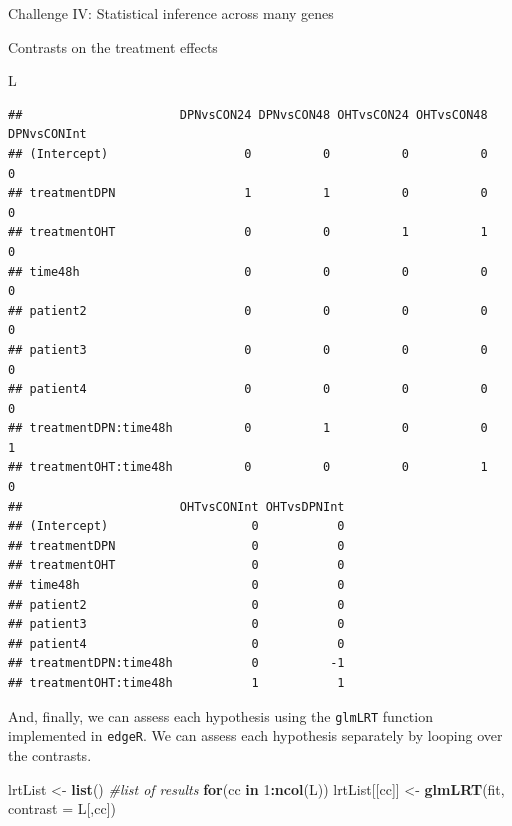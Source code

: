 \documentclass[ignorenonframetext,]{beamer}
\newenvironment{Shaded}{\begin{snugshade}}{\end{snugshade}}
\newcommand{\CommentTok}[1]{\textcolor[rgb]{0.56,0.35,0.01}{\textit{#1}}}
\newcommand{\ControlFlowTok}[1]{\textcolor[rgb]{0.13,0.29,0.53}{\textbf{#1}}}
\newcommand{\DataTypeTok}[1]{\textcolor[rgb]{0.13,0.29,0.53}{#1}}
\newcommand{\DecValTok}[1]{\textcolor[rgb]{0.00,0.00,0.81}{#1}}
\newcommand{\KeywordTok}[1]{\textcolor[rgb]{0.13,0.29,0.53}{\textbf{#1}}}
\newcommand{\NormalTok}[1]{#1}
\newcommand{\OperatorTok}[1]{\textcolor[rgb]{0.81,0.36,0.00}{\textbf{#1}}}
\newcommand{\StringTok}[1]{\textcolor[rgb]{0.31,0.60,0.02}{#1}}
\begin{document}
\begin{frame}[fragile]{Challenge IV: Statistical inference across many
genes}
\begin{block}{Contrasts on the treatment effects}
\begin{Shaded}
\begin{Highlighting}[]
\NormalTok{L}
\end{Highlighting}
\end{Shaded}

\begin{verbatim}
##                      DPNvsCON24 DPNvsCON48 OHTvsCON24 OHTvsCON48 DPNvsCONInt
## (Intercept)                   0          0          0          0           0
## treatmentDPN                  1          1          0          0           0
## treatmentOHT                  0          0          1          1           0
## time48h                       0          0          0          0           0
## patient2                      0          0          0          0           0
## patient3                      0          0          0          0           0
## patient4                      0          0          0          0           0
## treatmentDPN:time48h          0          1          0          0           1
## treatmentOHT:time48h          0          0          0          1           0
##                      OHTvsCONInt OHTvsDPNInt
## (Intercept)                    0           0
## treatmentDPN                   0           0
## treatmentOHT                   0           0
## time48h                        0           0
## patient2                       0           0
## patient3                       0           0
## patient4                       0           0
## treatmentDPN:time48h           0          -1
## treatmentOHT:time48h           1           1
\end{verbatim}

And, finally, we can assess each hypothesis using the \texttt{glmLRT}
function implemented in \texttt{edgeR}. We can assess each hypothesis
separately by looping over the contrasts.

\begin{Shaded}
\begin{Highlighting}[]
\NormalTok{lrtList <-}\StringTok{ }\KeywordTok{list}\NormalTok{() }\CommentTok{#list of results}
\ControlFlowTok{for}\NormalTok{(cc }\ControlFlowTok{in} \DecValTok{1}\OperatorTok{:}\KeywordTok{ncol}\NormalTok{(L)) lrtList[[cc]] <-}\StringTok{ }\KeywordTok{glmLRT}\NormalTok{(fit, }\DataTypeTok{contrast =}\NormalTok{ L[,cc])}


\end{Highlighting}
\end{Shaded}
\end{block}
\end{frame}
\end{document}
